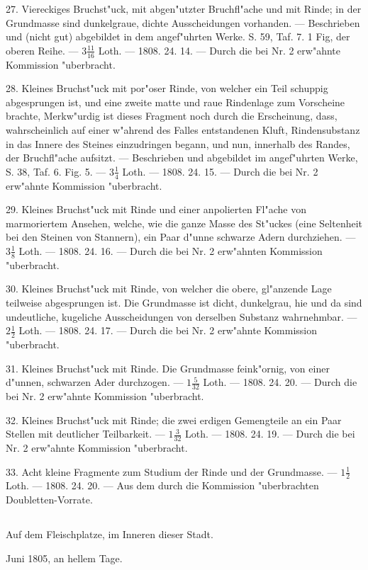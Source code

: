 \documentclass[a4paper, 11pt, oneside, polutonikogreek, german]{article}
\begin{document}
27. Viereckiges Bruchst"uck, mit abgen"utzter Bruchfl"ache und mit Rinde; in der Grundmasse sind dunkelgraue, dichte Ausscheidungen vorhanden. --- Beschrieben und (nicht gut) abgebildet in dem angef"uhrten Werke. S. 59, Taf. 7. 1 Fig, der oberen Reihe. --- $\mathfrak{3\frac{11}{16}}$ Loth. --- 1808. 24. 14. --- Durch die bei Nr. 2 erw"ahnte Kommission "uberbracht.

28. Kleines Bruchst"uck mit por"oser Rinde, von welcher ein Teil schuppig abgesprungen ist, und eine zweite matte und raue Rindenlage zum Vorscheine brachte, Merkw"urdig ist dieses Fragment noch durch die Erscheinung, dass, wahrscheinlich auf einer w"ahrend des Falles entstandenen Kluft, Rindensubstanz in das Innere des Steines einzudringen begann, und nun, innerhalb des Randes, der Bruchfl"ache aufsitzt. --- Beschrieben und abgebildet im angef"uhrten Werke, S. 38, Taf. 6. Fig. 5. --- $\mathfrak{3\frac{1}{4}}$ Loth. --- 1808. 24. 15. --- Durch die bei Nr. 2 erw"ahnte Kommission "uberbracht.

29. Kleines Bruchst"uck mit Rinde und einer anpolierten Fl"ache von marmoriertem Ansehen, welche, wie die ganze Masse des St"uckes (eine Seltenheit bei den Steinen von Stannern), ein Paar d"unne schwarze Adern durchziehen. --- $\mathfrak{3\frac{1}{8}}$ Loth. --- 1808. 24. 16. --- Durch die bei Nr. 2 erw"ahnten Kommission "uberbracht.

30. Kleines Bruchst"uck mit Rinde, von welcher die obere, gl"anzende Lage teilweise abgesprungen ist. Die Grundmasse ist dicht, dunkelgrau, hie und da sind undeutliche, kugeliche Ausscheidungen von derselben Substanz wahrnehmbar. --- $\mathfrak{2\frac{1}{2}}$ Loth. --- 1808. 24. 17. --- Durch die bei Nr. 2 erw"ahnte Kommission "uberbracht.

31. Kleines Bruchst"uck mit Rinde. Die Grundmasse feink"ornig, von einer d"unnen, schwarzen Ader durchzogen. --- $\mathfrak{1\frac{5}{32}}$ Loth. --- 1808. 24. 20. --- Durch die bei Nr. 2 erw"ahnte Kommission "uberbracht.

32. Kleines Bruchst"uck mit Rinde; die zwei erdigen Gemengteile an ein Paar Stellen mit deutlicher Teilbarkeit. --- $\mathfrak{1\frac{3}{32}}$ Loth. --- 1808. 24. 19. --- Durch die bei Nr. 2 erw"ahnte Kommission "uberbracht.

33. Acht kleine Fragmente zum Studium der Rinde und der Grundmasse. --- $\mathfrak{1\frac{1}{2}}$ Loth. --- 1808. 24. 20. --- Aus dem durch die Kommission "uberbrachten Doubletten-Vorrate.
\subsection{}
\begin{center}

Auf dem Fleischplatze, im Inneren dieser Stadt.

Juni 1805, an hellem Tage.
\end{center}
\end{document}
